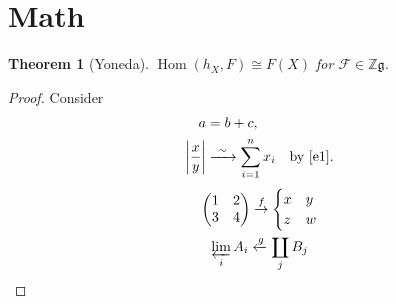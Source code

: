 \documentclass{article}
\newtheorem{thm}{Theorem}[section]
\theoremstyle{definition}\newtheorem{defn}[thm]{Definition}
\DeclareMathOperator{\Hom}{Hom}
\DeclarePairedDelimiter\abs{\lvert}{\rvert}
\begin{document}
\section{Math}
\begin{thm}[Yoneda]\label{t}
$\Hom(h_X,F)\cong F(X)$ for $\mathscr{F}\in\mathbb{Z}\mathfrak{g}$.
\end{thm}
\begin{proof}
Consider
\begin{align}
  a &= b + c, \label{e1}\\
  \abs*{\frac{x}{y}} &\xrightarrow{\ \sim\ } \sum_{i=1}^{n} x_i \quad\text{by \eqref{e1}}.
\end{align}
\begin{gather*} \begin{pmatrix}1&2\\3&4\end{pmatrix}\overset{f}{\to}\begin{cases}x&y\\z&w\end{cases}\\
\varprojlim_{i} A_i \xleftarrow{g} \coprod_j B_j \end{gather*}
\end{proof}
\end{document}
